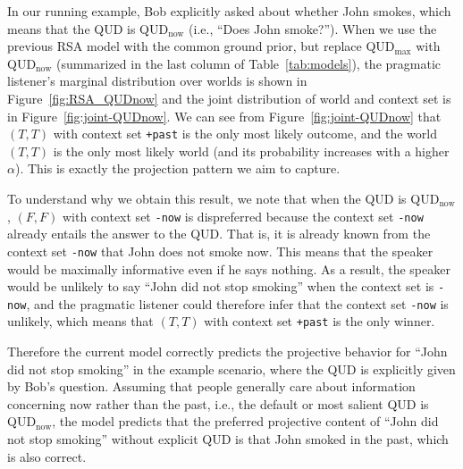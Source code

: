 In our running example, Bob explicitly asked about whether John smokes, 
 which means that the QUD is QUD$_\textrm{now}$ (i.e., ``Does John smoke?'').
When we use the previous RSA model with the common ground prior, but  
 replace QUD$_\textrm{max}$ with QUD$_\textrm{now}$ (summarized in the 
 last column of Table~\ref{tab:models}), the pragmatic listener's marginal distribution over worlds is shown in Figure~\ref{fig:RSA_QUDnow} and the joint
 distribution of world and context set is in Figure~\ref{fig:joint-QUDnow}.
We can see from Figure~\ref{fig:joint-QUDnow} that $(T, T)$ with context set
 \verb=+past= is 
 the only most likely outcome, and the world $(T, T)$ is the 
 only most likely world (and its probability increases with a higher $\alpha$).
This is exactly the projection pattern we aim to capture.

To understand why we obtain this result, we note that 
 when the QUD is QUD$_\textrm{now}$, $(F, F)$ with context set
 \verb=-now= is dispreferred because the context set \verb=-now= already entails 
 the answer to the QUD. 
That is, it is already known from the context set \verb=-now= that John does not 
 smoke now.
This means that the speaker would be maximally informative even if he says nothing.
As a result, the speaker would be unlikely to say ``John did not stop smoking'' 
 when the context set is \verb=-now=, and the pragmatic listener could therefore
 infer that the context set \verb=-now= is unlikely, which means that 
 $(T, T)$ with context set \verb=+past= is the only winner.


Therefore the current model correctly predicts the projective behavior for 
 ``John did not stop smoking'' in the example scenario, where the QUD is explicitly
 given by Bob's question. 
Assuming that people generally care about information concerning now rather than 
 the past, i.e., the default or most salient QUD is QUD$_\text{now}$,
the model predicts that the preferred projective content of 
 ``John did not stop smoking'' without explicit QUD is that 
 John smoked in the past, which is also correct.

